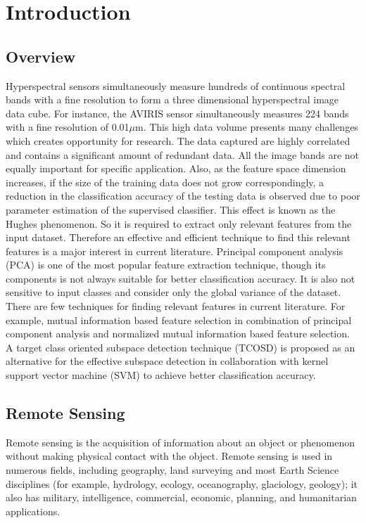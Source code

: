 \documentclass[document.tex]{subfiles}
\begin{document}
	
\chapter{Introduction}

\section{Overview}
\noindent Hyperspectral sensors simultaneously measure hundreds of continuous spectral bands with a fine resolution to form a three dimensional hyperspectral image data cube. For instance, the AVIRIS sensor simultaneously measures 224 bands with a fine resolution of 0.01$\mu$m. This high data volume presents many challenges which creates opportunity for research. The data captured are highly correlated and contains a significant amount of redundant data. All the image bands are not equally important for specific application.  Also, as the feature space dimension increases, if the size of the training data does not grow correspondingly, a reduction in the classification accuracy of the testing data is observed due to poor parameter estimation of the supervised classifier. This effect is known as the Hughes phenomenon\cite{1}. So it is required to extract only relevant features from the input dataset. Therefore an effective and efficient technique to find this relevant features is a major interest in current literature. Principal component analysis (PCA)\cite{7} is one of the most popular feature extraction technique, though its components is not always suitable for better classification accuracy\cite{8}. It is also not sensitive to input classes and consider only the global variance of the dataset. There are few techniques for finding relevant features in current literature. For example, mutual information based feature selection in combination of principal component analysis\cite{10} and normalized mutual information based feature selection\cite{9}. A target class oriented subspace detection technique (TCOSD) is proposed as an alternative for the effective subspace detection in collaboration with kernel support vector machine (SVM)\cite{11} to achieve better classification accuracy.

\clearpage  

\section{Remote Sensing}
\noindent Remote sensing is the acquisition of information about an object or phenomenon without making physical contact with the object. Remote sensing is used in numerous fields, including geography, land surveying and most Earth Science disciplines (for example, hydrology, ecology, oceanography, glaciology, geology); it also has military, intelligence, commercial, economic, planning, and humanitarian applications.
\end{document}
